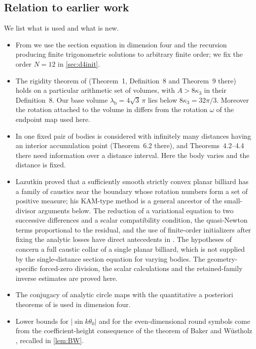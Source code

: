 \documentclass[11pt]{amsart}
\numberwithin{equation}{section}
\theoremstyle{definition}
\theoremstyle{remark}
\newcommand{\abs}[1]{\lvert #1\rvert}
\newcommand{\lb}{\lambda_{\mathrm b}}
\begin{document}
\subsection{Relation to earlier work}
We list what is used and what is new.
\begin{itemize}
\item From \cite{Had} we use the section equation in dimension four and the recursion producing finite trigonometric solutions to arbitrary finite order; we fix the order $N=12$ in \cref{sec:d4init}.
\item The rigidity theorem of \cite{HR} (Theorem~1, Definition~8 and Theorem~9 there) holds on a particular arithmetic set of volumes, with $A>8\kappa_3$ in their Definition~8. Our base volume $\lb=4\sqrt3\,\pi$ lies below $8\kappa_3=32\pi/3$. Moreover the rotation attached to the volume in \cite{HR} differs from the rotation $\omega$ of the endpoint map used here.
\item In \cite{FRSY} one fixed pair of bodies is considered with infinitely many distances having an interior accumulation point (Theorem~6.2 there), and Theorems~4.2--4.4 there need information over a distance interval. Here the body varies and the distance is fixed.
\item Lazutkin \cite{Laz} proved that a sufficiently smooth strictly convex planar billiard has a family of caustics near the boundary whose rotation numbers form a set of positive measure; his KAM-type method is a general ancestor of the small-divisor arguments below. The reduction of a variational equation to two successive differences and a scalar compatibility condition, the quasi-Newton terms proportional to the residual, and the use of finite-order initializers after fixing the analytic losses have direct antecedents in \cite{OAI1,OAI2}. The hypotheses of \cite{OAI1,OAI2} concern a full caustic collar of a single planar billiard, which is not supplied by the single-distance section equation for varying bodies. The geometry-specific forced-zero division, the scalar calculations and the retained-family inverse estimates are proved here.
\item The conjugacy of analytic circle maps with the quantitative a posteriori theorems of \cite{FHL} is used in dimension four.
\item Lower bounds for $\abs{\sin k\theta_0}$ and for the even-dimensional round symbols come from the coefficient-height consequence of the theorem of Baker and W\"ustholz \cite{BW}, recalled in \cref{lem:BW}.
\end{itemize}
\end{document}
